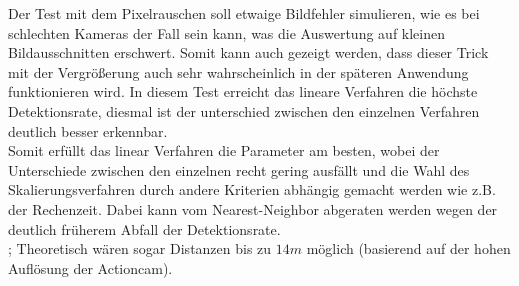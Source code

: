 Der Test mit dem Pixelrauschen soll etwaige Bildfehler simulieren, wie es bei schlechten Kameras der Fall sein kann, was die Auswertung auf kleinen Bildausschnitten erschwert. Somit kann auch gezeigt werden, dass dieser Trick mit der Vergrößerung auch sehr wahrscheinlich in der späteren Anwendung funktionieren wird. In diesem Test erreicht das lineare Verfahren die höchste Detektionsrate, diesmal ist der unterschied zwischen den einzelnen Verfahren deutlich besser erkennbar.\\
Somit erfüllt das linear Verfahren die Parameter am besten, wobei der Unterschiede zwischen den einzelnen recht gering ausfällt und die Wahl des Skalierungsverfahren durch andere Kriterien abhängig gemacht werden wie z.B. der Rechenzeit. Dabei kann vom Nearest-Neighbor abgeraten werden wegen der deutlich früherem Abfall der Detektionsrate.\\;
Theoretisch wären sogar Distanzen bis zu $14m$ möglich (basierend auf der hohen Auflösung der Actioncam).